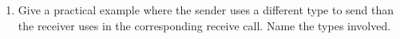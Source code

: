 \begin{enumerate}
\item Give a practical example where the sender uses a different type to send
  than the receiver uses in the corresponding receive call. Name the types involved.
\begin{comment}

\item Give a simple model for the time a send operation takes.

\item Give a simple model for the time a broadcast of a single scalar takes.


\item 
\end{comment}
\end{enumerate}

